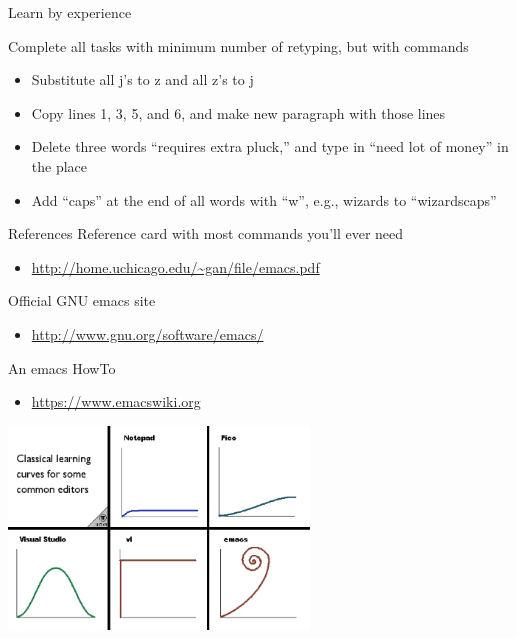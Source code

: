 \documentclass[newPxFont,sthlmFooter,nooffset]{beamer}
\begin{document}
\begin{frame}[containsverbatim,t]{Learn by experience}




Complete all tasks with minimum number of retyping, but with commands
\begin{itemize}
\item Substitute all j's to z and all z's to j
\item Copy lines 1, 3, 5, and 6, and make new paragraph with those lines
\item Delete three words ``requires extra pluck,'' and type in ``need lot of money'' in the place
\item Add ``caps'' at the end of all words with ``w'', e.g., wizards to ``wizardscaps''
\end{itemize}


\end{frame}

\begin{frame}[t]{References}
Reference card with most commands you’ll ever need
\begin{itemize}
\item \url{http://home.uchicago.edu/~gan/file/emacs.pdf}
\end{itemize}
\bigskip
Official GNU emacs site
\begin{itemize}
\item \url{http://www.gnu.org/software/emacs/}
\end{itemize}

\bigskip
An emacs HowTo
\begin{itemize}
\item \url{https://www.emacswiki.org}
\end{itemize}
\vspace{-2em}
\hfill
\includegraphics[width=0.6\textwidth]{./figure/learning_curve.png}
\end{frame}

\end{document}
